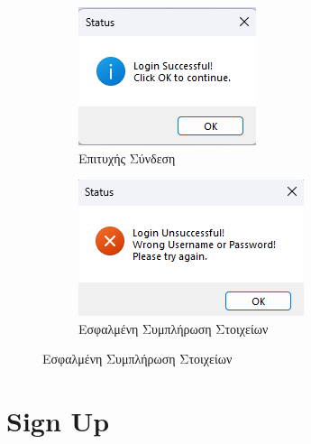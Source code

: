 \documentclass[12pt]{article}
\newcommand{\en}[1]{\foreignlanguage{English}{#1}}
\begin{document}
 
\begin{figure}
  \centering
  \begin{subfigure}{0.38\textwidth}
    \includegraphics[width=\linewidth]{loginmsg.png}
    \caption{Επιτυχής Σύνδεση}
    \label{fig:subfig1}
  \end{subfigure}
  \hfill
  \begin{subfigure}{0.45\textwidth}
    \includegraphics[width=\linewidth]{msgloginerror.png}
    \caption{Εσφαλμένη Συμπλήρωση Στοιχείων}
    \label{fig:subfig2}
  \end{subfigure}

  \label{fig:two_images}
\end{figure}

\section*{\en{Sign Up}}
\end{document}
